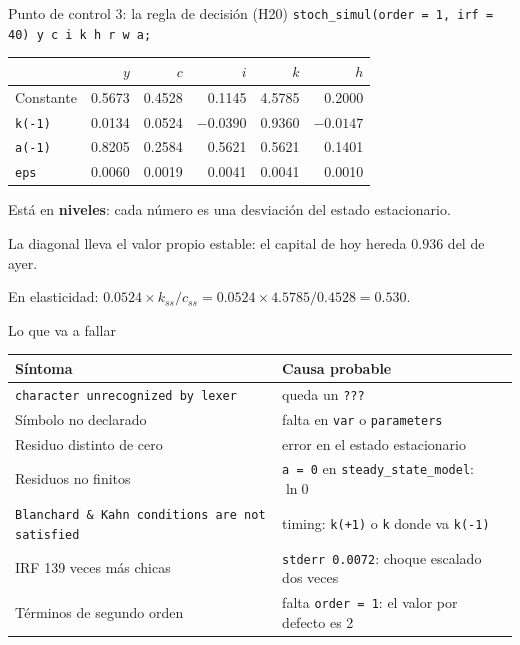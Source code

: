 \begin{frame}[label=control3]{Punto de control 3: la regla de decisión (H20)}
  \centering\small
  \texttt{stoch\_simul(order = 1, irf = 40) y c i k h r w a;}\par
  \vspace{0.25cm}
  \setlength{\tabcolsep}{4.5pt}
  \begin{tabular}{@{}lrrrrr@{}}
    \toprule
    & $y$ & $c$ & $i$ & $k$ & $h$\\
    \midrule
    Constante & 0.5673 & 0.4528 & 0.1145 & 4.5785 & 0.2000\\
    \texttt{k(-1)} & 0.0134 & 0.0524 & $-0.0390$ & \num{0.9360} & $-0.0147$\\
    \texttt{a(-1)} & 0.8205 & 0.2584 & 0.5621 & 0.5621 & 0.1401\\
    \texttt{eps} & 0.0060 & 0.0019 & 0.0041 & 0.0041 & 0.0010\\
    \bottomrule
  \end{tabular}
  \par\vspace{0.3cm}\raggedright\normalsize
  Está en \textbf{niveles}: cada número es una desviación del estado estacionario.\par
  \vspace{0.15cm}
  La diagonal lleva el valor propio estable: el capital de hoy hereda $0.936$ del de
  ayer.\par
  \vspace{0.15cm}
  En elasticidad: $0.0524\times k_{ss}/c_{ss}=0.0524\times4.5785/0.4528=\num{0.530}$.
\end{frame}

\begin{frame}[label=errores]{Lo que va a fallar}
  \footnotesize
  \renewcommand{\arraystretch}{1.2}
  \begin{tabular}{@{}>{\raggedright\arraybackslash}p{4.6cm}>{\raggedright\arraybackslash}p{5.6cm}@{}}
    \toprule
    \textbf{Síntoma} & \textbf{Causa probable}\\
    \midrule
    \texttt{character unrecognized by lexer} & queda un \texttt{???}\\
    Símbolo no declarado & falta en \texttt{var} o \texttt{parameters}\\
    Residuo distinto de cero & error en el estado estacionario\\
    Residuos no finitos & \texttt{a = 0} en \texttt{steady\_state\_model}: $\ln 0$\\
    \texttt{Blanchard \& Kahn conditions are not satisfied} & timing: \texttt{k(+1)} o \texttt{k} donde va \texttt{k(-1)}\\
    IRF 139 veces más chicas & \texttt{stderr 0.0072}: choque escalado dos veces\\
    Términos de segundo orden & falta \texttt{order = 1}: el valor por defecto es 2\\
    \bottomrule
  \end{tabular}
\end{frame}

